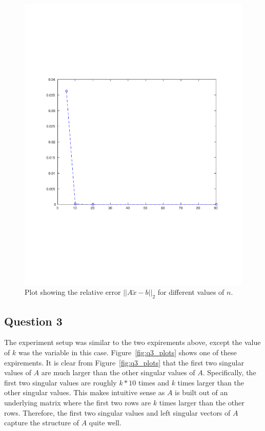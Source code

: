 \begin{figure}[th]
  \centering
  \includegraphics[trim=10mm 70mm 10mm 70mm, width=1.0\textwidth]{../q2_plots}
  \caption{Plot showing the relative error \(||A\tilde{x}-b||_2\) for different values of \(n\).}
  \label{fig:q2_plots}
\end{figure}

\newpage
\subsection{Question 3}



\newpage
The experiment setup was similar to the two expirements above, except the value of \(k\) was the variable in this case.
Figure~\ref{fig:q3_plots} shows one of these expirements.
It is clear from Figure~\ref{fig:q3_plots} that the first two singular values of \(A\) are much larger than the other singular values of \(A\).
Specifically, the first two singular values are roughly \(k*10\) times and \(k\) times larger than the other singular values.
This makes intuitive sense as \(A\) is built out of an underlying matrix where the first two rows are \(k\) times larger than the other rows.
Therefore, the first two singular values and left singular vectors of \(A\) capture the structure of \(A\) quite well.

